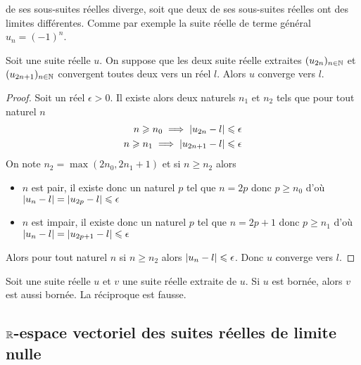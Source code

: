 de ses sous-suites réelles diverge, soit que deux de ses sous-suites réelles ont 
des limites différentes. Comme par exemple la suite réelle de terme général 
\(u_n = (-1)^n\).
\begin{prop}
  Soit une suite réelle \(u\). On suppose que les deux suite réelle extraites 
  \((u_{2n})_{n \in \mathbb{N}}\) et \((u_{2n+1})_{n \in \mathbb{N}}\) convergent toutes deux 
  vers un réel \(l\). Alors \(u\) converge vers \(l\).
\end{prop}
\begin{proof}
  Soit un réel \(\epsilon>0\). Il existe alors deux naturels \(n_1\) et \(n_2\) 
  tels que pour tout naturel \(n\)
  \begin{align}
    n \geqslant n_0 \implies \left\lvert u_{2n}-l\right\rvert \leqslant \epsilon \\  n \geqslant 
    n_1 \implies \left\lvert u_{2n+1}-l\right\rvert \leqslant \epsilon
  \end{align}
  On note \(n_2 = \max(2n_0,2n_1+1)\) et si \(n \geqslant n_2\) alors
  \begin{itemize}
    \item \(n\) est pair, il existe donc un naturel \(p\) tel que \(n = 2p\) 
      donc \(p\geqslant n_0\) d'où \(\left\lvert u_n-l\right\rvert = \left\lvert u_{2p}-l\right\rvert \leqslant 
      \epsilon\)
    \item \(n\) est impair, il existe donc un naturel \(p\) tel que \(n = 2p+1\) 
      donc \(p\geqslant n_1\) d'où \(\left\lvert u_n-l\right\rvert = \left\lvert u_{2p+1}-l\right\rvert \leqslant 
      \epsilon\)
  \end{itemize}
  Alors pour tout naturel \(n\) si \(n \geqslant n_2\) alors \(\left\lvert u_n-l\right\rvert 
  \leqslant \epsilon\). Donc \(u\) converge vers \(l\).
\end{proof}
\begin{prop}
  Soit une suite réelle \(u\) et \(v\) une suite réelle extraite de \(u\). Si 
  \(u\) est bornée, alors \(v\) est aussi bornée. La réciproque est fausse.
\end{prop}

\subsection{\(\mathbb{R}\)-espace vectoriel des suites réelles de limite nulle}

